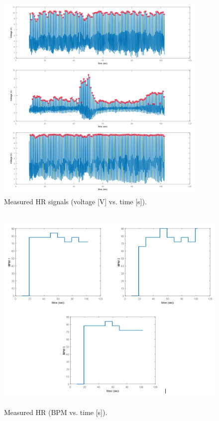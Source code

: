 \documentclass[paper=a4, fontsize=11pt]{scrartcl}
\numberwithin{equation}{section}		%
\numberwithin{figure}{section}			%
\numberwithin{table}{section}		    %
\begin{document}
\begin{appendices}
\begin{figure}[H]
	\begin{center} 
		\includegraphics[height=4in,width=4in]{measured_data} 
		\caption{Measured HR signals (voltage [V] vs. time [s]).\label{fig:measdat}} 
	\end{center} 
\end{figure}

\begin{figure}[H]
	\begin{center} 
		\includegraphics[height=4in,width=5in]{measured_bpm} 
		\caption{Measured HR (BPM vs. time [s]).\label{fig:measbpm}} 
	\end{center} 
\end{figure}


\end{appendices}
\end{document}
